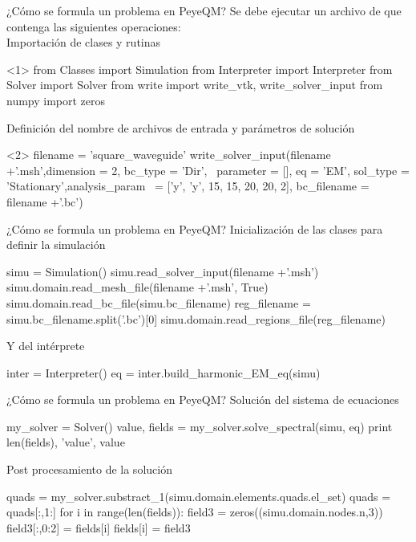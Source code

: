 \documentclass[xcolor=table,serif]{beamer}
\begin{document}
	\begin{frame}[fragile]{¿Cómo se formula un problema en PeyeQM?}
	Se debe ejecutar un archivo de que contenga las siguientes operaciones:\\
		\pause
		Importación de clases y rutinas
		\begin{python}<1>
		from Classes import Simulation
		from Interpreter import Interpreter
		from Solver import Solver
		from write import write_vtk, write_solver_input 
		from numpy import zeros
		\end{python}	
		\pause 
		Definición del nombre de archivos de entrada y parámetros de solución
		\begin{python}<2>
	filename = 'square_waveguide'
	write_solver_input(filename +'.msh',dimension = 2, bc_type = 		'Dir', \
	parameter = [], eq = 'EM', sol_type = 'Stationary',analysis_param \
	= ['y', 'y', 15, 15, 20, 20, 2], bc_filename = filename +'.bc')  
		\end{python}
	\end{frame}
	\begin{frame}[fragile]{¿Cómo se formula un problema en PeyeQM?}
	Inicialización de las clases para definir la simulación
	\begin{python}
simu = Simulation()
simu.read_solver_input(filename +'.msh')
simu.domain.read_mesh_file(filename +'.msh', True)
simu.domain.read_bc_file(simu.bc_filename)
reg_filename = simu.bc_filename.split('.bc')[0]
simu.domain.read_regions_file(reg_filename)
	\end{python}
	\pause
	Y del intérprete
	\begin{python}
inter = Interpreter()
eq = inter.build_harmonic_EM_eq(simu)
	\end{python}	
	
	\end{frame}
	\begin{frame}[fragile]{¿Cómo se formula un problema en PeyeQM?}
	Solución del sistema de ecuaciones	
	\begin{python}
	my_solver = Solver()
value, fields = my_solver.solve_spectral(simu, eq)
print len(fields), 'value', value
	\end{python}
	\pause
	Post procesamiento de la solución
	\begin{python}
quads = my_solver.substract_1(simu.domain.elements.quads.el_set)
quads = quads[:,1:]
for i in range(len(fields)):
    field3 =  zeros((simu.domain.nodes.n,3))
    field3[:,0:2] = fields[i]
    fields[i] = field3
	\end{python}
	\end{frame}
\end{document}
